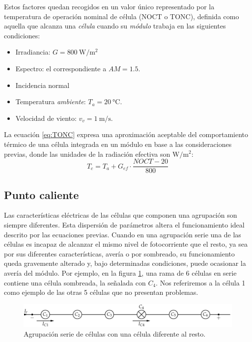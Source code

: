 Estos factores quedan recogidos en un valor único representado por
la temperatura de operación nominal de célula (NOCT o TONC), definida
como aquella que alcanza una \emph{célula} cuando su \emph{módulo}
trabaja en las siguientes condiciones: 
\needspace{5\onelineskip}
\begin{itemize}
\item Irradiancia: $G=\SI{800}{\watt\per\meter\squared}$
\item Espectro: el correspondiente a $AM=1.5$.
\item Incidencia normal
\item Temperatura \emph{ambiente}: $T_{a}=\SI{20}{\celsius}$.
\item Velocidad de viento: $v_{v}=\SI{1}{\meter\per\second}$.
\end{itemize}
La ecuación \ref{eq:TONC} expresa una aproximación aceptable del
comportamiento térmico de una célula integrada en un módulo en base
a las consideraciones previas, donde las unidades de la radiación
efectiva son $\si{\watt\per\meter\squared}$:\begin{equation}
T_{c}=T_{a}+G_{ef}\cdot\frac{NOCT-20}{800}\label{eq:TONC}\end{equation}





\subsection{Punto caliente}

\nocite{Alonso-Garcia.Ruiz.ea2006,Alonso-Garcia.Herrmann.ea2003,Alonso-Garcia2005}

Las características eléctricas de las células que componen una agrupación
son siempre diferentes. Esta dispersión de parámetros altera el funcionamiento
ideal descrito por las ecuaciones previas. Cuando en una agrupación
serie una de las células es incapaz de alcanzar el mismo nivel de
fotocorriente que el resto, ya sea por sus diferentes características,
avería o por sombreado, su funcionamiento queda gravemente alterado
y, bajo determinadas condiciones, puede ocasionar la avería del módulo.
Por ejemplo, en la figura \ref{fig:CelulaSombreada}, una rama de
6 células en serie contiene una célula sombreada, la señalada con
$C_{4}$. Nos referiremos a la célula 1 como ejemplo de las otras
5 células que no presentan problemas. 


\begin{figure}
\begin{centering}
\includegraphics[scale=0.7]{../figs/AsociacionSerieCelulas}
\end{centering}

\caption{Agrupación serie de células con una célula diferente al resto.\label{fig:CelulaSombreada}}

\end{figure}

